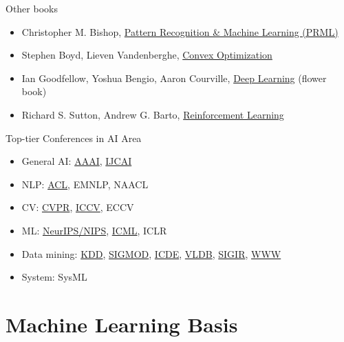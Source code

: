\documentclass{../TexTemplate/myslide}
\begin{document}
\begin{frame}{Other books}
\begin{itemize}
	\item Christopher M. Bishop, \href{http://users.isr.ist.utl.pt/~wurmd/Livros/school/Bishop\%20-\%20Pattern\%20Recognition\%20And\%20Machine\%20Learning\%20-\%20Springer\%20\%202006.pdf}{Pattern Recognition \& Machine Learning (PRML)}
	\item Stephen Boyd, Lieven Vandenberghe, \href{https://web.stanford.edu/~boyd/cvxbook/bv_cvxbook.pdf}{Convex Optimization}
	\item Ian Goodfellow, Yoshua Bengio, Aaron Courville, \href{https://www.deeplearningbook.org/}{Deep Learning} (flower book)
	\item Richard S. Sutton, Andrew G. Barto, \href{https://web.stanford.edu/class/psych209/Readings/SuttonBartoIPRLBook2ndEd.pdf}{Reinforcement Learning}
\end{itemize}
\end{frame}

\begin{frame}{Top-tier Conferences in AI Area}
\begin{itemize}
	\item General AI: \underline{AAAI}, \underline{IJCAI}
	\item NLP: \underline{ACL}, EMNLP, NAACL
	\item CV: \underline{CVPR}, \underline{ICCV}, ECCV
	\item ML: \underline{NeurIPS/NIPS}, \underline{ICML}, ICLR
	\item Data mining: \underline{KDD}, \underline{SIGMOD}, \underline{ICDE}, \underline{VLDB}, \underline{SIGIR}, \underline{WWW}
	\item System: SysML
\end{itemize}
\end{frame}

\section{Machine Learning Basis}
\begin{frame}
\sectionpage
\end{frame}
\end{document}
